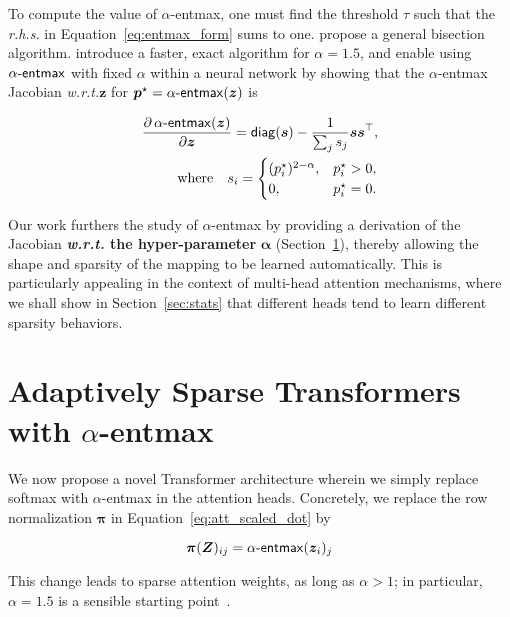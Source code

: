 \documentclass[11pt,a4paper]{article}
\makeatletter
\newcommand*{\wrt}{\textit{w.\hspace{.07em}r\hspace{.07em}.t.}\@\xspace}
\newcommand*{\rhs}{\textit{r.\hspace{.07em}h\hspace{.07em}.s.}\@\xspace}
\newcommand{\amap}{\bm{\pi}}
\newcommand{\pfrac}[2]{\frac{\partial #1}{\partial #2}}
\newcommand\pp{p}
\newcommand\p{\bm{\pp}}
\newcommand\xx{z}
\newcommand\x{\bm{\xx}}
\newcommand{\eqnref}[1]{Equation~\ref{eq:#1}}
\newcommand{\secref}[1]{Section~\ref{sec:#1}}
\newcommand\thresh{\tau}
\DeclareMathOperator*{\diag}{\mathsf{diag}}
\newcommand*\entmaxtext{entmax\xspace}
\newcommand*\aentmax[1][\alpha]{\mathop{\mathsf{#1}\textnormal{-}\mathsf{\entmaxtext}}}
\makeatother
\begin{document}
To compute the value of $\alpha$-\entmaxtext, one must find the
threshold $\thresh$ such that the \rhs in \eqnref{entmax_form} sums
to one. \citet{blondel2019learning} propose a general bisection
algorithm. \citet{entmax} introduce a faster, exact algorithm for
$\alpha=1.5$, and enable using $\aentmax$ with fixed $\alpha$ within
a neural network by showing that the $\alpha$-\entmaxtext Jacobian
\wrt $\x$ for $\p^\star = \aentmax(\x)$ is

\begin{equation}
\begin{aligned}
\pfrac{\aentmax(\x)}{\x} = \diag(\bm{s}) - \frac{1}{\sum_j s_j} \bm{ss}^\top, \\
\text{where}\quad s_i = \begin{cases}(\pp_i^\star)^{2-\alpha}, & \pp_i^\star > 0, \\
0,& \pp_i^\star = 0. \\\end{cases}
\end{aligned}
\end{equation}

Our work furthers the study of $\alpha$-\entmaxtext by providing a
derivation of the Jacobian {\bf \wrt the hyper-parameter}
$\boldsymbol{\alpha}$ (\secref{adaptive}), thereby allowing the shape
and sparsity of the mapping to be learned automatically. This is
particularly appealing in the context of multi-head attention
mechanisms, where we shall show in \secref{stats} that different
heads tend to learn different sparsity behaviors.

\section{Adaptively Sparse Transformers\\\quad with {\boldmath $\alpha$}-\entmaxtext}
\label{sec:adaptive}

We now propose a novel Transformer architecture wherein we simply
replace softmax with $\alpha$-\entmaxtext{} in the attention heads.
Concretely, we replace the row normalization $\amap$ in
\eqnref{att_scaled_dot} by

\begin{equation}
    \amap(\bm{Z})_{ij} = \aentmax(\bm{z}_i)_j
\end{equation}

This change leads to sparse attention weights, as long as
$\alpha>1$; in particular, $\alpha=1.5$ is a sensible starting
point~\citep{entmax}.
\end{document}
